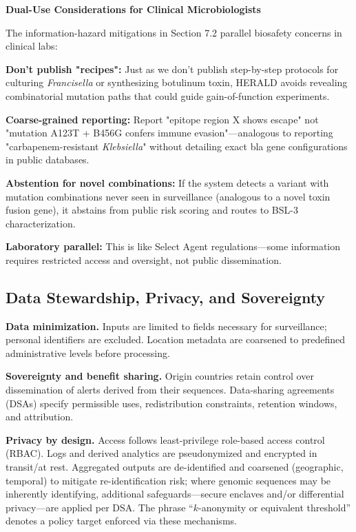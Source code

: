 \documentclass[11pt]{article}
\begin{document}
\begin{mdframed}[backgroundcolor=red!5]
\textbf{Dual-Use Considerations for Clinical Microbiologists}

The information-hazard mitigations in Section 7.2 parallel biosafety concerns in clinical labs:

\textbf{Don't publish "recipes":} Just as we don't publish step-by-step protocols for culturing \emph{Francisella} or synthesizing botulinum toxin, HERALD avoids revealing combinatorial mutation paths that could guide gain-of-function experiments.

\textbf{Coarse-grained reporting:} Report "epitope region X shows escape" not "mutation A123T + B456G confers immune evasion"—analogous to reporting "carbapenem-resistant \emph{Klebsiella}" without detailing exact bla gene configurations in public databases.

\textbf{Abstention for novel combinations:} If the system detects a variant with mutation combinations never seen in surveillance (analogous to a novel toxin fusion gene), it abstains from public risk scoring and routes to BSL-3 characterization.

\textbf{Laboratory parallel:} This is like Select Agent regulations—some information requires restricted access and oversight, not public dissemination.
\end{mdframed}

\subsection{Data Stewardship, Privacy, and Sovereignty}
\label{sec:datagov}
\textbf{Data minimization.} Inputs are limited to fields necessary for surveillance; personal identifiers are excluded. Location metadata are coarsened to predefined administrative levels before processing.

\noindent\textbf{Sovereignty and benefit sharing.} Origin countries retain control over dissemination of alerts derived from their sequences. Data-sharing agreements (DSAs) specify permissible uses, redistribution constraints, retention windows, and attribution.

\noindent\textbf{Privacy by design.} Access follows least-privilege role-based access control (RBAC). Logs and derived analytics are pseudonymized and encrypted in transit/at rest. Aggregated outputs are de-identified and coarsened (geographic, temporal) to mitigate re-identification risk; where genomic sequences may be inherently identifying, additional safeguards—secure enclaves and/or differential privacy—are applied per DSA. The phrase “$k$-anonymity or equivalent threshold” denotes a policy target enforced via these mechanisms.
\end{document}
